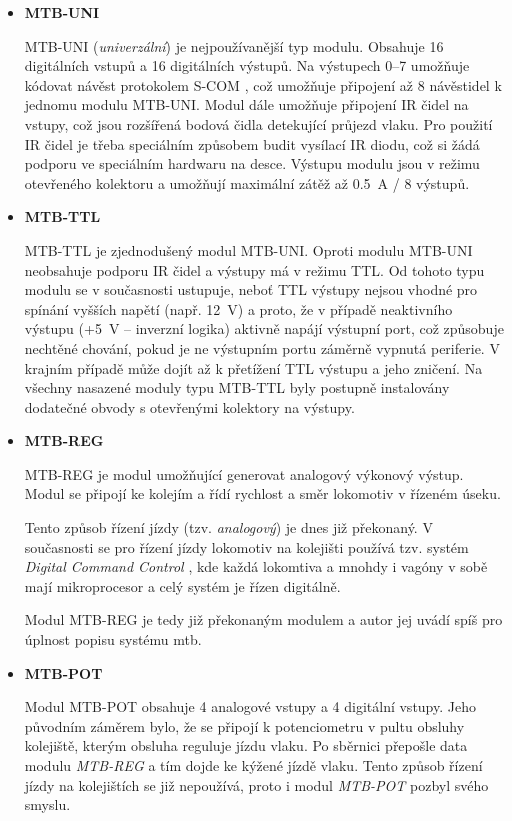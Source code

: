 \begin{itemize}
\item \textbf{MTB-UNI}

	MTB-UNI (\textit{univerzální}) je nejpoužívanější typ modulu. Obsahuje 16
	digitálních vstupů a 16 digitálních výstupů. Na výstupech 0–7 umožňuje kódovat
	návěst protokolem S-COM \cite{}, což umožňuje připojení až 8 návěstidel
	k jednomu modulu MTB-UNI. Modul dále umožňuje připojení IR čidel na vstupy,
	což jsou rozšířená bodová čidla detekující průjezd vlaku. Pro použití IR
	čidel je třeba speciálním způsobem budit vysílací IR diodu, což si žádá podporu
	ve speciálním hardwaru na desce. Výstupu modulu jsou v režimu otevřeného
	kolektoru a umožňují maximální zátěž až 0.5~A / 8 výstupů.

\item \textbf{MTB-TTL}

	MTB-TTL je zjednodušený modul MTB-UNI. Oproti modulu MTB-UNI neobsahuje
	podporu IR čidel a výstupy má v režimu TTL. Od tohoto typu modulu se v
	současnosti ustupuje, neboť TTL výstupy nejsou vhodné pro spínání vyšších
	napětí (např. 12~V) a proto, že v případě neaktivního výstupu (+5~V –
	inverzní logika) aktivně napájí výstupní port, což způsobuje nechtěné chování,
	pokud je ne výstupním portu záměrně vypnutá periferie. V krajním případě může
	dojít až k přetížení TTL výstupu a jeho zničení. Na všechny nasazené moduly
	typu MTB-TTL byly postupně instalovány dodatečné obvody s otevřenými
	kolektory na výstupy.

\item \textbf{MTB-REG}

	MTB-REG je modul umožňující generovat analogový výkonový výstup. Modul se
	připojí ke kolejím a řídí rychlost a směr lokomotiv v řízeném úseku.

	Tento způsob řízení jízdy (tzv. \textit{analogový}) je dnes již překonaný.
	V současnosti se pro řízení jízdy lokomotiv na kolejišti používá tzv. systém
	\textit{Digital Command Control} \cite{dcc}, kde každá lokomtiva a mnohdy
	i vagóny v sobě mají mikroprocesor a celý systém je řízen digitálně.

	Modul MTB-REG je tedy již překonaným modulem a autor jej uvádí spíš pro
	úplnost popisu systému \gls{mtb}.

\item \textbf{MTB-POT}

	Modul MTB-POT obsahuje 4 analogové vstupy a 4 digitální vstupy. Jeho
	původním záměrem bylo, že se připojí k potenciometru v pultu obsluhy
	kolejiště, kterým obsluha reguluje jízdu vlaku. Po sběrnici přepošle data
	modulu \textit{MTB-REG} a tím dojde ke kýžené jízdě vlaku. Tento způsob
	řízení jízdy na kolejištích se již nepoužívá, proto i modul \textit{MTB-POT}
	pozbyl svého smyslu.

\end{itemize}

